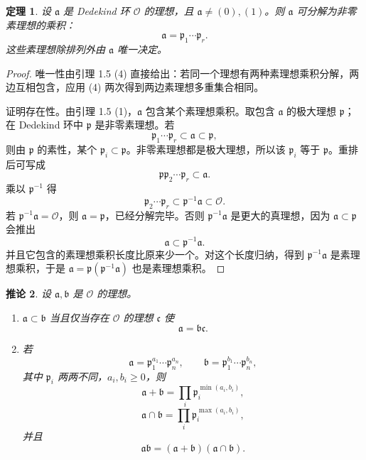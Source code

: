 \documentclass[11pt,a4paper,openany]{ctexbook}
\numberwithin{equation}{chapter}
\theoremstyle{plain}
\newtheorem{theorem}{定理}[chapter]
\newtheorem{corollary}[theorem]{推论}
\theoremstyle{definition}
\theoremstyle{remark}
\begin{document}
\begin{theorem}
设 $\mathfrak a$ 是 Dedekind 环 $\mathcal O$ 的理想，且 $\mathfrak a\ne(0),(1)$。则 $\mathfrak a$ 可分解为非零素理想的乘积：
\[
\mathfrak a=\mathfrak p_1\cdots\mathfrak p_r.
\]
这些素理想除排列外由 $\mathfrak a$ 唯一决定。
\end{theorem}

\begin{proof}
唯一性由引理 1.5 (4) 直接给出：若同一个理想有两种素理想乘积分解，两边互相包含，应用 (4) 两次得到两边素理想多重集合相同。

证明存在性。由引理 1.5 (1)，$\mathfrak a$ 包含某个素理想乘积。取包含 $\mathfrak a$ 的极大理想 $\mathfrak p$；在 Dedekind 环中 $\mathfrak p$ 是非零素理想。若
\[
\mathfrak p_1\cdots\mathfrak p_r\subset\mathfrak a\subset\mathfrak p,
\]
则由 $\mathfrak p$ 的素性，某个 $\mathfrak p_i\subset\mathfrak p$。非零素理想都是极大理想，所以该 $\mathfrak p_i$ 等于 $\mathfrak p$。重排后可写成
\[
\mathfrak p\mathfrak p_2\cdots\mathfrak p_r\subset\mathfrak a.
\]
乘以 $\mathfrak p^{-1}$ 得
\[
\mathfrak p_2\cdots\mathfrak p_r\subset \mathfrak p^{-1}\mathfrak a\subset\mathcal O.
\]
若 $\mathfrak p^{-1}\mathfrak a=\mathcal O$，则 $\mathfrak a=\mathfrak p$，已经分解完毕。否则 $\mathfrak p^{-1}\mathfrak a$ 是更大的真理想，因为 $\mathfrak a\subset\mathfrak p$ 会推出
\[
\mathfrak a\subset \mathfrak p^{-1}\mathfrak a.
\]
并且它包含的素理想乘积长度比原来少一个。对这个长度归纳，得到 $\mathfrak p^{-1}\mathfrak a$ 是素理想乘积，于是 $\mathfrak a=\mathfrak p(\mathfrak p^{-1}\mathfrak a)$ 也是素理想乘积。
\end{proof}

\begin{corollary}
设 $\mathfrak a,\mathfrak b$ 是 $\mathcal O$ 的理想。
\begin{enumerate}[label=(\arabic*)]
\item $\mathfrak a\subset\mathfrak b$ 当且仅当存在 $\mathcal O$ 的理想 $\mathfrak c$ 使
\[
\mathfrak a=\mathfrak b\mathfrak c.
\]
\item 若
\[
\mathfrak a=\mathfrak p_1^{a_1}\cdots\mathfrak p_n^{a_n},\qquad
\mathfrak b=\mathfrak p_1^{b_1}\cdots\mathfrak p_n^{b_n},
\]
其中 $\mathfrak p_i$ 两两不同，$a_i,b_i\ge0$，则
\[
\mathfrak a+\mathfrak b=\prod_i\mathfrak p_i^{\min(a_i,b_i)},
\]
\[
\mathfrak a\cap\mathfrak b=\prod_i\mathfrak p_i^{\max(a_i,b_i)},
\]
并且
\[
\mathfrak a\mathfrak b=(\mathfrak a+\mathfrak b)(\mathfrak a\cap\mathfrak b).
\]
\end{enumerate}
\end{corollary}
\end{document}
